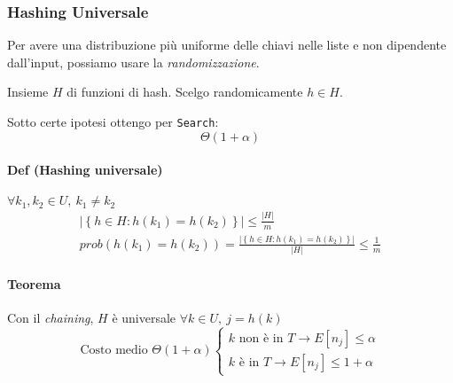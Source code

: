 \subsubsection{Hashing Universale} 
Per avere una distribuzione più uniforme delle chiavi nelle liste e non dipendente dall'input,
possiamo usare la \emph{randomizzazione}. \par
Insieme $H$ di funzioni di hash. Scelgo randomicamente $h \in H$. \par
Sotto certe ipotesi ottengo per \texttt{Search}:
$$\Theta(1 + \alpha)$$

\paragraph{Def (Hashing universale)} $\forall k_1,k_2 \in U, \ k_1 \neq k_2$
\begin{gather*}
	\left| \left\{ h \in H : h(k_1) = h(k_2) \right\} \right| \leq \frac{|H|}{m} \\
	prob(h(k_1) = h(k_2)) = \frac{\left| \left\{ h \in H : h(k_1) = h(k_2) \right\} \right|}{|H|} \leq \frac{1}{m}
\end{gather*}

\paragraph{Teorema} Con il \emph{chaining}, $H$ è universale $ \forall k \in U, \ j = h(k)$
\[ \text{Costo medio } \Theta(1+\alpha)
	\begin{cases}
		k \text{ non è in } T \rightarrow E[n_j] \leq \alpha \\
		k \text{ è in } T \rightarrow E[n_j] \leq 1 + \alpha
	\end{cases}
\]